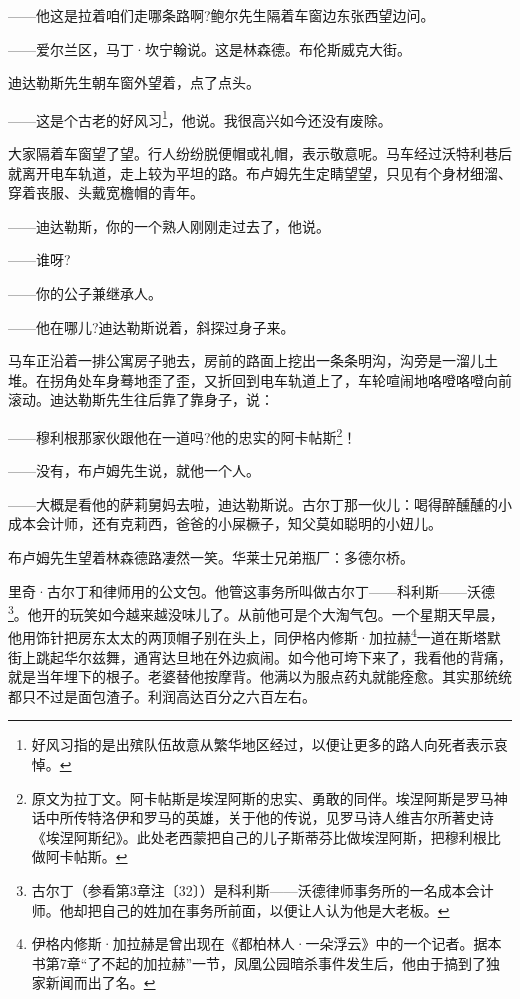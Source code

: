 \par ——他这是拉着咱们走哪条路啊?鲍尔先生隔着车窗边东张西望边问。
\par ——爱尔兰区，马丁·坎宁翰说。这是林森德。布伦斯威克大街。
\par 迪达勒斯先生朝车窗外望着，点了点头。
\par ——这是个古老的好风习\footnote{好风习指的是出殡队伍故意从繁华地区经过，以便让更多的路人向死者表示哀悼。}，他说。我很高兴如今还没有废除。
\par 大家隔着车窗望了望。行人纷纷脱便帽或礼帽，表示敬意呢。马车经过沃特利巷后就离开电车轨道，走上较为平坦的路。布卢姆先生定睛望望，只见有个身材细溜、穿着丧服、头戴宽檐帽的青年。
\par ——迪达勒斯，你的一个熟人刚刚走过去了，他说。
\par ——谁呀?
\par ——你的公子兼继承人。
\par ——他在哪儿?迪达勒斯说着，斜探过身子来。
\par 马车正沿着一排公寓房子驰去，房前的路面上挖出一条条明沟，沟旁是一溜儿土堆。在拐角处车身蓦地歪了歪，又折回到电车轨道上了，车轮喧闹地咯噔咯噔向前滚动。迪达勒斯先生往后靠了靠身子，说：
\par ——穆利根那家伙跟他在一道吗?他的忠实的阿卡帖斯\footnote{原文为拉丁文。阿卡帖斯是埃涅阿斯的忠实、勇敢的同伴。埃涅阿斯是罗马神话中所传特洛伊和罗马的英雄，关于他的传说，见罗马诗人维吉尔所著史诗《埃涅阿斯纪》。此处老西蒙把自己的儿子斯蒂芬比做埃涅阿斯，把穆利根比做阿卡帖斯。}！
\par ——没有，布卢姆先生说，就他一个人。
\par ——大概是看他的萨莉舅妈去啦，迪达勒斯说。古尔丁那一伙儿：喝得醉醺醺的小成本会计师，还有克莉西，爸爸的小屎橛子，知父莫如聪明的小妞儿。
\par 布卢姆先生望着林森德路凄然一笑。华莱士兄弟瓶厂：多德尔桥。
\par 里奇·古尔丁和律师用的公文包。他管这事务所叫做古尔丁——科利斯——沃德\footnote{古尔丁（参看第3章注〔32〕）是科利斯——沃德律师事务所的一名成本会计师。他却把自己的姓加在事务所前面，以便让人认为他是大老板。}。他开的玩笑如今越来越没味儿了。从前他可是个大淘气包。一个星期天早晨，他用饰针把房东太太的两顶帽子别在头上，同伊格内修斯·加拉赫\footnote{伊格内修斯·加拉赫是曾出现在《都柏林人·一朵浮云》中的一个记者。据本书第7章“了不起的加拉赫”一节，凤凰公园暗杀事件发生后，他由于搞到了独家新闻而出了名。}一道在斯塔默街上跳起华尔兹舞，通宵达旦地在外边疯闹。如今他可垮下来了，我看他的背痛，就是当年埋下的根子。老婆替他按摩背。他满以为服点药丸就能痊愈。其实那统统都只不过是面包渣子。利润高达百分之六百左右。
